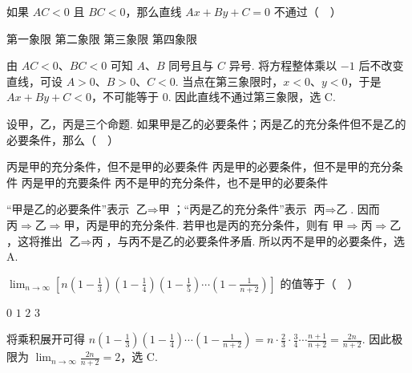 \documentclass[UTF8,a4paper,oneside,11pt]{ctexbook}
\begin{document}
\begin{problem}
如果 \(AC<0\) 且 \(BC<0\)，那么直线 \(Ax+By+C=0\) 不通过（\(\quad\)）

\choices
    {第一象限}
    {第二象限}
    {第三象限}
    {第四象限}


\begin{solution}
由 \(AC<0\)、\(BC<0\) 可知 \(A\)、\(B\) 同号且与 \(C\) 异号. 将方程整体乘以 \(-1\) 后不改变直线，可设 \(A>0\)、\(B>0\)、\(C<0\). 当点在第三象限时，\(x<0\)、\(y<0\)，于是 \(Ax+By+C<0\)，不可能等于 \(0\). 因此直线不通过第三象限，选 C.
\end{solution}
\end{problem}

\begin{problem}
设甲，乙，丙是三个命题. 如果甲是乙的必要条件；丙是乙的充分条件但不是乙的必要条件，那么（\(\quad\)）

\choices
    {丙是甲的充分条件，但不是甲的必要条件}
    {丙是甲的必要条件，但不是甲的充分条件}
    {丙是甲的充要条件}
    {丙不是甲的充分条件，也不是甲的必要条件}


\begin{solution}
“甲是乙的必要条件”表示 \(\text{乙}\Rightarrow\text{甲}\)；“丙是乙的充分条件”表示 \(\text{丙}\Rightarrow\text{乙}\). 因而 \(\text{丙}\Rightarrow\text{乙}\Rightarrow\text{甲}\)，丙是甲的充分条件. 若甲也是丙的充分条件，则有 \(\text{甲}\Rightarrow\text{丙}\Rightarrow\text{乙}\)，这将推出 \(\text{乙}\Rightarrow\text{丙}\)，与丙不是乙的必要条件矛盾. 所以丙不是甲的必要条件，选 A.
\end{solution}
\end{problem}

\begin{problem}
\(\displaystyle\lim_{n\to\infty}\left[n\left(1-\frac{1}{3}\right)\left(1-\frac{1}{4}\right)\left(1-\frac{1}{5}\right)\cdots\left(1-\frac{1}{n+2}\right)\right]\) 的值等于（\(\quad\)）

\choices
    {\(0\)}
    {\(1\)}
    {\(2\)}
    {\(3\)}


\begin{solution}
将乘积展开可得
\(n\left(1-\frac{1}{3}\right)\left(1-\frac{1}{4}\right)\cdots\left(1-\frac{1}{n+2}\right)=n\cdot\frac{2}{3}\cdot\frac{3}{4}\cdots\frac{n+1}{n+2}=\frac{2n}{n+2}\). 因此极限为 \(\displaystyle\lim_{n\to\infty}\frac{2n}{n+2}=2\)，选 C.
\end{solution}
\end{problem}
\end{document}
